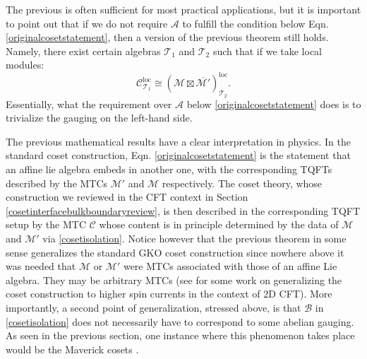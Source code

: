 \documentclass[11pt]{article}
\numberwithin{equation}{section}
\begin{document}
The previous is often sufficient for most practical applications, but it is important to point out that if we do not require $\mathcal{A}$ to fulfill the condition below Eqn. \eqref{originalcosetstatement}, then a version of the previous theorem still holds. Namely, there exist certain algebras $\mathcal{T}_{1}$ and $\mathcal{T}_{2}$ such that if we take local modules:
\begin{equation} \label{actualcosettheorem}
    \mathcal{C}^{\mathrm{loc}}_{\mathcal{T}_{1}} \cong (\mathcal{M} \boxtimes \overline{\mathcal{M}'})^{\mathrm{loc}}_{\mathcal{T}_{2}}.
\end{equation}
Essentially, what the requirement over $\mathcal{A}$ below \eqref{originalcosetstatement} does is to trivialize the gauging on the left-hand side.



The previous mathematical results have a clear interpretation in physics. In the standard coset construction, Eqn. \eqref{originalcosetstatement} is the statement that an affine lie algebra embeds in another one, with the corresponding TQFTs described by the MTCs $\mathcal{M}'$ and $\mathcal{M}$ respectively. The coset theory, whose construction we reviewed in the CFT context in Section \ref{cosetinterfacebulkboundaryreview}, is then described in the corresponding TQFT setup by the MTC $\mathcal{C}$ whose content is in principle determined by the data of $\mathcal{M}$ and $\mathcal{M}'$ via \eqref{cosetisolation}. Notice however that the previous theorem in some sense generalizes the standard GKO coset construction since nowhere above it was needed that $\mathcal{M}$ or $\mathcal{M}'$ were MTCs associated with those of an affine Lie algebra. They may be arbitrary MTCs (see \cite{Bais:1987zk} for some work on generalizing the coset construction to higher spin currents in the context of 2D CFT). More importantly, a second point of generalization, stressed above, is that $\mathcal{B}$ in \eqref{cosetisolation} does not necessarily have to correspond to some abelian gauging. As seen in the previous section, one instance where this phenomenon takes place would be the Maverick cosets \cite{Fuchs:1995tq, Pedrini:1999iy, Dunbar:1992gh, Dunbar:1993hr,Bais:2008ni}.
\end{document}
